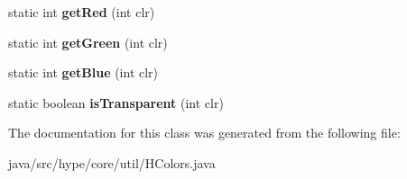 \begin{DoxyCompactItemize}
\item 
\hypertarget{classhype_1_1core_1_1util_1_1_h_colors_a8e7a37a4e014078f84014ef97c3a4ce9}{static int {\bfseries get\-Red} (int clr)}\label{classhype_1_1core_1_1util_1_1_h_colors_a8e7a37a4e014078f84014ef97c3a4ce9}

\item 
\hypertarget{classhype_1_1core_1_1util_1_1_h_colors_a48ea544be73650414dcd56a112a04bfe}{static int {\bfseries get\-Green} (int clr)}\label{classhype_1_1core_1_1util_1_1_h_colors_a48ea544be73650414dcd56a112a04bfe}

\item 
\hypertarget{classhype_1_1core_1_1util_1_1_h_colors_a1800020b2bae22dc75a0b13f02c23d8f}{static int {\bfseries get\-Blue} (int clr)}\label{classhype_1_1core_1_1util_1_1_h_colors_a1800020b2bae22dc75a0b13f02c23d8f}

\item 
\hypertarget{classhype_1_1core_1_1util_1_1_h_colors_a301c2418d919af73193e673f7090027a}{static boolean {\bfseries is\-Transparent} (int clr)}\label{classhype_1_1core_1_1util_1_1_h_colors_a301c2418d919af73193e673f7090027a}

\end{DoxyCompactItemize}


The documentation for this class was generated from the following file\-:\begin{DoxyCompactItemize}
\item 
java/src/hype/core/util/H\-Colors.\-java\end{DoxyCompactItemize}
